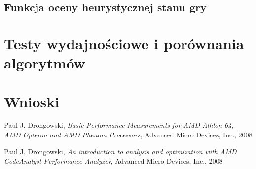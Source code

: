 \documentclass{scrartcl}
\begin{document}
\subsection{Funkcja oceny heurystycznej stanu gry}

\section{Testy wydajnościowe i porównania algorytmów}

\section{Wnioski}

\begin{thebibliography}{9}

 Paul J. Drongowski,
  \emph{Basic Performance Measurements for AMD Athlon 64, 
AMD Opteron and AMD Phenom Processors}, Advanced Micro Devices, Inc.,
  2008

 Paul J. Drongowski,
  \emph{An introduction to analysis and optimization 
with AMD CodeAnalyst Performance Analyzer}, Advanced Micro Devices, Inc.,
  2008

\end{thebibliography}
\end{document}
